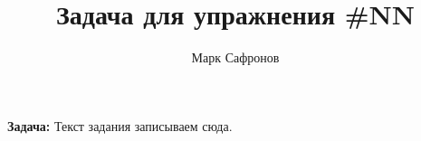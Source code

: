 \documentclass{article}
\title{Задача для упражнения \#NN}
\author{Марк Сафронов}
\begin{document}
\maketitle

\textbf{Задача:} Текст задания записываем сюда.
\end{document}
